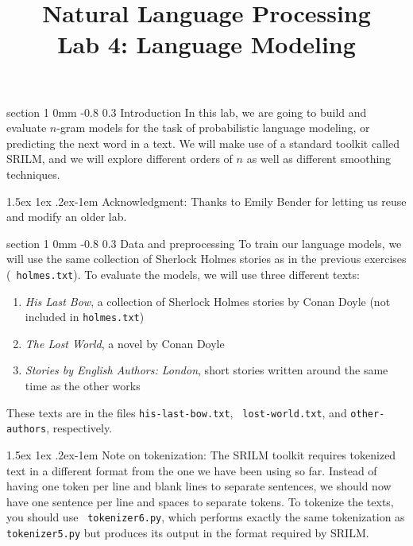 \documentclass[11pt]{article}
\title{{\LARGE Natural Language Processing}\\[1.5mm]{\large Lab 4: Language Modeling}}
\author{}
\date{} %
\makeatletter
\newcommand{\newsec}[2]{\section{#1}\label{sec:#2}\noindent}
\renewcommand{\section}{\@startsection
{section}%
{1}%
{0mm}%
{-0.8\baselineskip}%
{0.3\baselineskip}%
{\bfseries\large}}%
\renewcommand{\paragraph}{%
  \@startsection{paragraph}{4}%
  {\z@}{1.5ex \@plus 1ex \@minus .2ex}{-1em}%
  {\normalfont\normalsize\bfseries}%
}\makeatother
\makeatother
\begin{document}
 

\maketitle
\vspace{-2mm}
\newsec{Introduction}{intro}%
In this lab, we are going to build and evaluate $n$-gram models %
for the task of probabilistic language modeling, or predicting the next word in a text. We will make use
of a standard toolkit called SRILM, and we will explore different orders of $n$ as well as different smoothing techniques. 

\paragraph{Acknowledgment:} Thanks to Emily Bender for letting us reuse
and modify an older lab.

\newsec{Data and preprocessing}{data}%
To train our language models, we will use the same collection of
Sherlock Holmes stories as in the previous exercises ({\tt
  holmes.txt}).  To evaluate the models, we will use three different
texts:
\begin{enumerate}[noitemsep,topsep=0.2cm]
\item \emph{His Last Bow}, a collection of Sherlock Holmes stories by
  Conan Doyle (not included in {\tt holmes.txt})
\item \emph{The Lost World}, a novel by Conan Doyle
\item \emph{Stories by English Authors: London}, short stories written
  around the same time as the other works
\end{enumerate}
These texts are in the files {\tt his-last-bow.txt}, {\tt
  lost-world.txt}, and {\tt other-authors}, respectively.

\paragraph{Note on tokenization:} The SRILM toolkit requires tokenized
text in a different format from the one we have been using so far.
Instead of having one token per line and blank lines to separate
sentences, we should now have one sentence per line and spaces to
separate tokens.  To tokenize the texts, you should use {\tt
  tokenizer6.py}, which performs exactly the same tokenization as {\tt
  tokenizer5.py} but produces its output in the format required by
SRILM.
\end{document}
